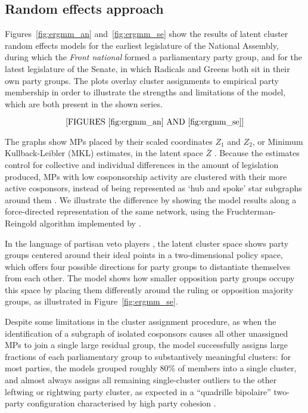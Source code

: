 
\subsection{Random effects approach}

Figures~\ref{fig:ergmm_an} and~\ref{fig:ergmm_se} show the results of latent cluster random effects models for the earliest legislature of the National Assembly, during which the \textit{Front national} formed a parliamentary party group, and for the latest legislature of the Senate, in which Radicals and Greens both sit in their own party groups. The plots overlay cluster assignments to empirical party membership in order to illustrate the strengths and limitations of the model, which are both present in the shown series.%

$$\textrm{[FIGURES~\ref{fig:ergmm_an} AND~\ref{fig:ergmm_se}]}$$

The graphs show MPs placed by their scaled coordinates $Z_1$ and $Z_2$, or Minimum Kullback-Leibler (MKL) estimates, in the latent space $\bar Z$ \citep[p.~7]{KrivitskyHandcock2009-SN}. Because the estimates control for collective and individual differences in the amount of legislation produced, MPs with low cosponsorship activity are clustered with their more active cosponsors, instead of being represented as `hub and spoke' star subgraphs around them \citep[p.~10]{KrivitskyHandcock2009-SN}. We illustrate the difference by showing the model results along a force-directed representation of the same network, using the Fruchterman-Reingold algorithm \citep{FruchtermanReingold1991-SPE} implemented by \citet{Butts2008-JSS}.%

In the language of partisan veto players \citep{Tsebelis2002-PUP}, the latent cluster space shows party groups centered around their ideal points in a two-dimensional policy space, which offers four possible directions for party groups to distantiate themselves from each other. The model shows how smaller opposition party groups occupy this space by placing them differently around the ruling or opposition majority groups, as illustrated in Figure~\ref{fig:ergmm_se}.%

Despite some limitations in the cluster assignment procedure, as when the identification of a subgraph of isolated cosponsors causes all other unassigned MPs to join a single large residual group, the model successfully assigns large fractions of each parliamentary group to substantively meaningful clusters: for most parties, the models grouped roughly 80\% of members into a single cluster, and almost always assigns all remaining single-cluster outliers to the other leftwing or rightwing party cluster, as expected in a ``quadrille bipolaire'' two-party configuration characterised by high party cohesion \citep{Duverger1968-PUF,Tsebelis2002-PUP}.%

